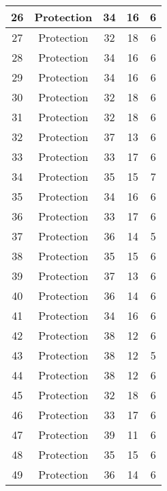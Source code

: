 \documentclass[results.tex]{subfiles}
\begin{document}
\begin{center}
\begin{tabular}{| c || c | c | c | c |}
    \hline
    26 & Protection & 34 & 16 & 6 \\ 
    \hline
    27 & Protection & 32 & 18 & 6 \\ 
    \hline
    28 & Protection & 34 & 16 & 6 \\ 
    \hline
    29 & Protection & 34 & 16 & 6 \\ 
    \hline
    30 & Protection & 32 & 18 & 6 \\ 
    \hline
    31 & Protection & 32 & 18 & 6 \\ 
    \hline
    32 & Protection & 37 & 13 & 6 \\ 
    \hline
    33 & Protection & 33 & 17 & 6 \\ 
    \hline
    34 & Protection & 35 & 15 & 7 \\ 
    \hline
    35 & Protection & 34 & 16 & 6 \\ 
    \hline
    36 & Protection & 33 & 17 & 6 \\ 
    \hline
    37 & Protection & 36 & 14 & 5 \\ 
    \hline
    38 & Protection & 35 & 15 & 6 \\ 
    \hline
    39 & Protection & 37 & 13 & 6 \\ 
    \hline
    40 & Protection & 36 & 14 & 6 \\ 
    \hline
    41 & Protection & 34 & 16 & 6 \\ 
    \hline
    42 & Protection & 38 & 12 & 6 \\ 
    \hline
    43 & Protection & 38 & 12 & 5 \\ 
    \hline
    44 & Protection & 38 & 12 & 6 \\ 
    \hline
    45 & Protection & 32 & 18 & 6 \\ 
    \hline
    46 & Protection & 33 & 17 & 6 \\ 
    \hline
    47 & Protection & 39 & 11 & 6 \\ 
    \hline
    48 & Protection & 35 & 15 & 6 \\ 
    \hline
    49 & Protection & 36 & 14 & 6 \\ 
    \hline   \end{tabular}
\end{center}
\end{document}
